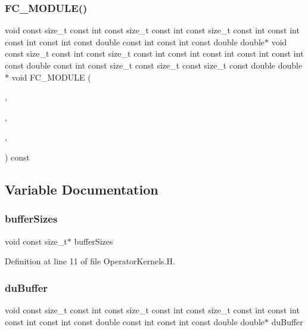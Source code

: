 \subsubsection{\texorpdfstring{F\+C\+\_\+\+M\+O\+D\+U\+L\+E()}{FC\_MODULE()}\hspace{0.1cm}{\footnotesize\ttfamily [4/4]}}
{\footnotesize\ttfamily void const size\+\_\+t const int const size\+\_\+t const int const size\+\_\+t const int const int const int const int const double const int const int const double double$\ast$ void const size\+\_\+t const int const size\+\_\+t const int const int const int const int const int const double const int const size\+\_\+t const size\+\_\+t const size\+\_\+t const double double$\ast$ void F\+C\+\_\+\+M\+O\+D\+U\+LE (\begin{DoxyParamCaption}\item[{operators}]{,  }\item[{applysinglestencil}]{,  }\item[{O\+P\+E\+R\+A\+T\+O\+RS}]{,  }\item[{A\+P\+P\+L\+Y\+S\+I\+N\+G\+L\+E\+S\+T\+E\+N\+C\+IL}]{ }\end{DoxyParamCaption}) const}



\subsection{Variable Documentation}
\hypertarget{OperatorKernels_8H_a302023d425dc22c2c647b4f9d8c78b0b}{}\label{OperatorKernels_8H_a302023d425dc22c2c647b4f9d8c78b0b} 
\subsubsection{\texorpdfstring{buffer\+Sizes}{bufferSizes}}
{\footnotesize\ttfamily void const size\+\_\+t$\ast$ buffer\+Sizes}



Definition at line 11 of file Operator\+Kernels.\+H.

\hypertarget{OperatorKernels_8H_a2e2f904f0824d100dd90a25fdbab0bff}{}\label{OperatorKernels_8H_a2e2f904f0824d100dd90a25fdbab0bff} 
\subsubsection{\texorpdfstring{du\+Buffer}{duBuffer}}
{\footnotesize\ttfamily void const size\+\_\+t const int const size\+\_\+t const int const size\+\_\+t const int const int const int const int const double const int const int const double double$\ast$ du\+Buffer}



